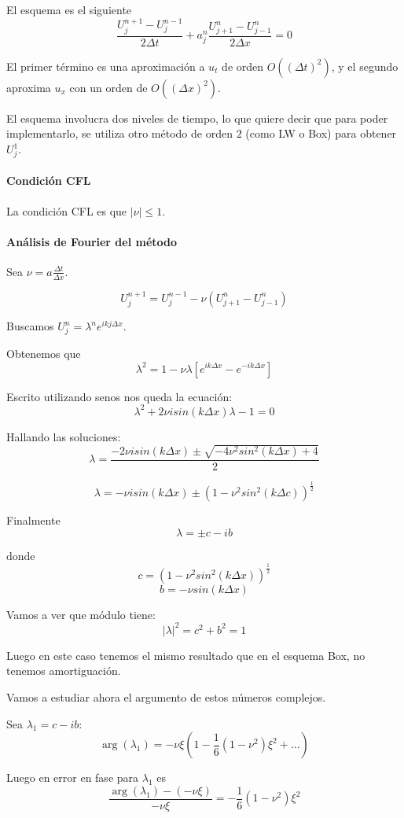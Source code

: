 El esquema es el siguiente
$$\frac{U_j^{n+1}-U_j^{n-1}}{2\Delta t} + a_j^n \frac{U_{j+1}^n-U_{j-1}^n}{2\Delta x} = 0 $$

El primer término es una aproximación a $u_t$ de orden $O((\Delta t)^2)$, y el segundo aproxima $u_x$ con un orden de $O((\Delta x)^2)$.

El esquema involucra dos niveles de tiempo, lo que quiere decir que para poder implementarlo, se utiliza otro método de orden $2$ (como LW o Box) para obtener $U_j^1$.

\paragraph{Condición CFL}
La condición CFL es que $|\nu| \le 1$.

\paragraph{Análisis de Fourier del método}

Sea $\nu = a\frac{\Delta t}{\Delta x}$.

$$U_j^{n+1} = U_{j}^{n-1}-\nu(U_{j+1}^n-U_{j-1}^n)$$

Buscamos $U_j^n = \lambda^n e^{ikj\Delta x}$.

Obtenemos que
$$\lambda^2 = 1-\nu\lambda \left[e^{ik\Delta x}-e^{-ik\Delta x}\right]$$

Escrito utilizando senos nos queda la ecuación:
$$\lambda^2+2\nu isin(k\Delta x)\lambda -1 = 0$$

Hallando las soluciones:
$$\lambda = \frac{-2\nu isin(k\Delta x)\pm\sqrt{-4\nu^2sin^2(k\Delta x)+4}}{2}$$

$$\lambda = -\nu isin(k\Delta x) \pm (1-\nu^2sin^2(k\Delta c))^{\frac{1}{2}}$$

Finalmente
$$\lambda = \pm c-ib$$

donde
$$c = (1-\nu^2sin^2(k\Delta x))^\frac{1}{2}$$
$$b=-\nu sin(k\Delta x)$$

Vamos a ver que módulo tiene:
$$|\lambda|^2 = c^2+b^2 = 1$$

Luego en este caso tenemos el mismo resultado que en el esquema Box, no tenemos amortiguación.

Vamos a estudiar ahora el argumento de estos números complejos.

Sea $\lambda_1 = c-ib$:
$$\arg(\lambda_1) = -\nu\xi (1-\frac{1}{6}(1-\nu^2)\xi^2+\hdots)$$

Luego en error en fase para $\lambda_1$ es
$$\frac{\arg(\lambda_1)-(-\nu\xi)}{-\nu\xi} = -\frac{1}{6}(1-\nu^2)\xi^2$$

